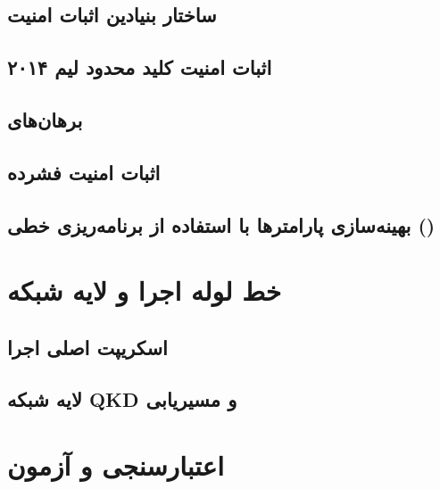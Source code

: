 \documentclass[11pt, a4paper, oneside]{book}
\begin{document}
	\chapter{ساختار بنیادین اثبات امنیت}
	\label{ch:base_proof}
	
	
	\chapter{اثبات امنیت کلید محدود لیم ۲۰۱۴}
	\label{ch:lim2014}
	
	
	\chapter{برهان‌های }
	\label{ch:ma_wang}
	
	
	\chapter{اثبات امنیت فشرده}
	\label{ch:tight}
	
	
	\chapter{بهینه‌سازی پارامترها با استفاده از برنامه‌ریزی خطی ()}
	\label{ch:optimization}
	
	
	\part{خط لوله اجرا و لایه شبکه}
	
	\chapter{اسکریپت اصلی اجرا}
	\label{ch:main}
	
	
	\chapter{لایه شبکه QKD و مسیریابی}
	\label{ch:network}
	
	
	\part{اعتبارسنجی و آزمون}
	
\end{document}
